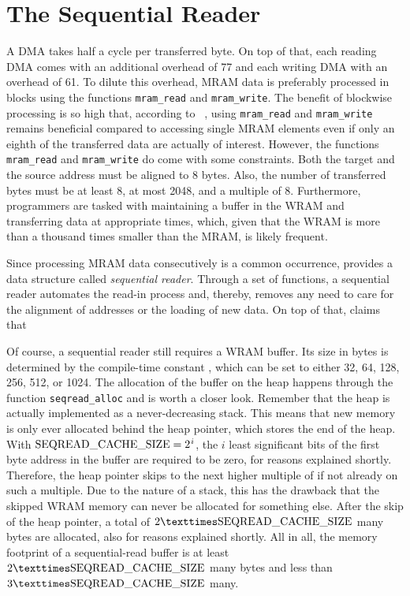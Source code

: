 \section{The Sequential Reader}
\label{sec:mram:seq_reader}

A \ac{DMA} takes half a cycle per transferred byte.
On top of that, each reading \ac{DMA} comes with an additional overhead of  \qty{77}{\cycles} and each writing \ac{DMA} with an overhead of \qty{61}{\cycles}.
To dilute this overhead, \ac{MRAM} data is preferably processed in blocks using the functions \lstinline|mram_read| and \lstinline|mram_write|.
The benefit of blockwise processing is so high that, according to \citeauthor{mutlu2022Benchmarking}~\cite[11]{mutlu2022Benchmarking}, using \lstinline|mram_read| and \lstinline|mram_write| remains beneficial compared to accessing single \ac{MRAM} elements even if only an eighth of the transferred data are actually of interest.
However, the functions \lstinline|mram_read| and \lstinline|mram_write| do come with some constraints.
Both the target and the source address must be aligned to 8 bytes.
Also, the number of transferred bytes must be at least 8, at most 2048, and a multiple of 8.
Furthermore, programmers are tasked with maintaining a buffer in the \ac{WRAM} and transferring data at appropriate times, which, given that the \ac{WRAM} is more than a thousand times smaller than the \ac{MRAM}, is likely frequent.

Since processing \ac{MRAM} data consecutively is a common occurrence, \upmem{} provides a data structure called \emph{sequential reader}.
Through a set of \langC{} functions, a sequential reader automates the read-in process and, thereby, removes any need to care for the alignment of addresses or the loading of new data.
On top of that, \upmem{} claims that ~\cite[Memory management -- Sequential readers]{upmemSDK}

Of course, a sequential reader still requires a \ac{WRAM} buffer.
Its size in bytes is determined by the compile-time constant \seqreadcachesize{}, which can be set to either 32, 64, 128, 256, 512, or 1024.
The allocation of the buffer on the heap happens through the function \lstinline|seqread_alloc| and is worth a closer look.
Remember that the heap is actually implemented as a never-decreasing stack.
This means that new memory is only ever allocated behind the heap pointer, which stores the end of the heap.
With \(\seqreadcachesize{} = \twotoi\), the \(i\) least significant bits of the first byte address in the buffer are required to be zero, for reasons explained shortly.
Therefore, the heap pointer skips to the next higher multiple of \seqreadcachesize{} if not already on such a multiple.
Due to the nature of a stack, this has the drawback that the skipped \ac{WRAM} memory can never be allocated for something else.
After the skip of the heap pointer, a total of \(2 × \seqreadcachesize{}\) many bytes are allocated, also for reasons explained shortly.
All in all, the memory footprint of a sequential-read buffer is at least \(2 × \seqreadcachesize{}\) many bytes and less than \(3 × \seqreadcachesize{}\) many.

